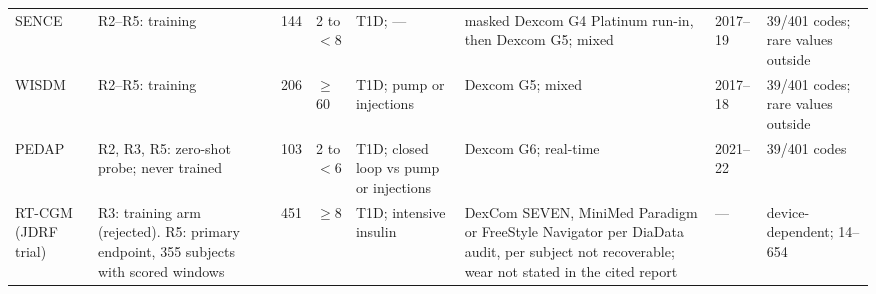 \documentclass[10pt,twocolumn]{article}
\begin{document}
\begin{table}[!tp]
\begin{tabular}{@{}p{1.55cm}p{3.05cm}p{1.15cm}p{1.1cm}p{0.95cm}p{2.4cm}p{3.35cm}p{1.0cm}p{1.5cm}@{}}
SENCE & R2--R5: training & \cite{sence2021cgm} & 144 & 2 to $<$8 & T1D; --- & masked Dexcom G4 Platinum run-in, then Dexcom G5; mixed & 2017--19 & 39/401 codes; rare values outside \\
WISDM & R2--R5: training & \cite{pratley2020wisdm} & 206 & $\geq$60 & T1D; pump or injections & Dexcom G5; mixed & 2017--18 & 39/401 codes; rare values outside \\
PEDAP & R2, R3, R5: zero-shot probe; never trained & \cite{wadwa2023pedap} & 103 & 2 to $<$6 & T1D; closed loop vs pump or injections & Dexcom G6; real-time & 2021--22 & 39/401 codes \\
RT-CGM (JDRF trial) & R3: training arm (rejected). R5: primary endpoint, 355 subjects with scored windows & \cite{jdrf2008cgm} & 451 & $\geq$8 & T1D; intensive insulin & DexCom SEVEN, MiniMed Paradigm or FreeStyle Navigator per DiaData audit, per subject not recoverable; wear not stated in the cited report & --- & device-de\-pen\-dent; 14--654 \\
\bottomrule
\end{tabular}
\end{table}
\end{document}
